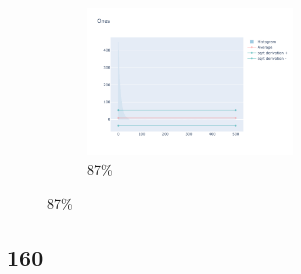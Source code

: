 \documentclass[12pt, fleqn]{report}                             %
\theoremstyle{break}                                            %
\begin{document}
\begin{figure}[ht!]
\begin{subfigure}[b]{0.4\linewidth}
          \includegraphics[width=0.6\textwidth]{Images/136/dia-d.png}
          \caption{87\%}
        \end{subfigure}
      \end{figure}


      \clearpage
      \subsection{160}
\end{document}
